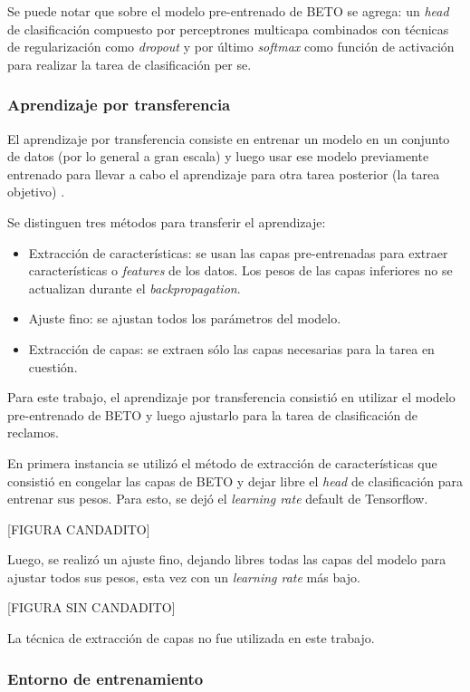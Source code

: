 Se puede notar que sobre el modelo pre-entrenado de BETO se agrega: un \textit{head} de clasificación compuesto por perceptrones multicapa combinados con técnicas de regularización como \textit{dropout} y por último \textit{softmax} como función de activación para realizar la tarea de clasificación per se.

\subsubsection{Aprendizaje por transferencia}

El aprendizaje por transferencia consiste en entrenar un modelo en un conjunto de datos (por lo general a gran escala) y luego usar ese modelo previamente entrenado para llevar a cabo el aprendizaje para otra tarea posterior (la tarea objetivo) \citep{WEBSITE:24}.

Se distinguen tres métodos para transferir el aprendizaje:
\begin{itemize}
	\item Extracción de características: se usan las capas pre-entrenadas para extraer características o \textit{features} de los datos. Los pesos de las capas inferiores no se actualizan durante el \textit{backpropagation}.
	\item Ajuste fino: se ajustan todos los parámetros del modelo.
	\item Extracción de capas: se extraen sólo las capas necesarias para la tarea en cuestión.
\end{itemize}

Para este trabajo, el aprendizaje por transferencia consistió en utilizar el modelo pre-entrenado de BETO y luego ajustarlo para la tarea de clasificación de reclamos.

En primera instancia se utilizó el método de extracción de características que consistió en congelar las capas de BETO y dejar libre el \textit{head} de clasificación para entrenar sus pesos. Para esto, se dejó el \textit{learning rate} default de Tensorflow.

[FIGURA CANDADITO]

Luego, se realizó un ajuste fino, dejando libres todas las capas del modelo para ajustar todos sus pesos, esta vez con un \textit{learning rate} más bajo.

[FIGURA SIN CANDADITO]

La técnica de extracción de capas no fue utilizada en este trabajo.

\subsubsection{Entorno de entrenamiento}



